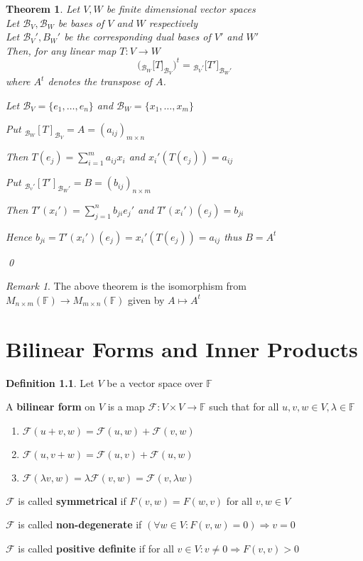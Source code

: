 \documentclass[11pt, a4paper]{report}
\makeatletter
\numberwithin{equation}{section}
\newcommand{\B}{\mathcal{B}}
\newcommand{\F}{\mathbb{F}}
\newcommand{\Fc}{\mathcal{F}}
\numberwithin{equation}{subsection}
\theoremstyle{plain}
\newtheorem{thm}{Theorem}[chapter] %
\theoremstyle{definition}
\newtheorem{defn}{Definition}[chapter]
\theoremstyle{remark}
\newtheorem*{rem}{Remark}
\newtheorem*{prf}{Proof}
\renewenvironment{prf}[1][\proofname]{\par
  \vspace{-\topsep}%
  \normalfont
  \topsep0pt \partopsep0pt %
  \trivlist
  \item[\hskip\labelsep
        \itshape
    #1\@addpunct{.}]\ignorespaces
}{%
  \popQED\endtrivlist\@endpefalse
  \addvspace{6pt plus 6pt} %
}
\newcommand{\pr}[1]{\begin{adjustwidth}{1cm}{} \begin{prf} #1 \end{prf} \end{adjustwidth}}
\makeatother
\begin{document}
\begin{thm}
Let $V, W$ be finite dimensional vector spaces\\
Let $\B_V, \B_W$ be bases of $V$ and $W$ respectively\\
Let $\B_V', B_W'$ be the corresponding dual bases of $V'$ and $W'$\\
Then, for any linear map $T: V \to W$
$$\Big( {_{\B_W}[}T]_{\B_V} \Big)^t = {_{\B_V'}[}T']_{\B_W'}$$
where $A^t$ denotes the transpose of $A$.

\pr{
Let $\B_V = \{ e_1, \ldots, e_n \}$ and $\B_W = \{ x_1, \ldots, x_m \}$

Put $_{\B_W}[T]_{\B_V} = A = (a_{ij})_{m \times n}$

Then $\displaystyle T(e_j) = \sum_{i=1}^m a_{ij} x_i$ and $x_i'(T(e_j)) = a_{ij}$

Put $_{\B_v'}[T']_{\B_W'} = B = (b_{ij})_{n \times m}$

Then $\displaystyle T'(x_i') = \sum_{j=1}^n b_{ji} e_j'$ and $T'(x_i')(e_j) = b_{ji}$

Hence $b_{ji} = T'(x_i')(e_j) = x_i'(T(e_j)) = a_{ij}$ thus $B = A^t$
}\qed
\end{thm}

\begin{rem} The above theorem is the isomorphism from $M_{n \times m}(\F) \to M_{m \times n}(\F)$ given by $A \mapsto A^t$ \end{rem}

\chapter{Bilinear Forms and Inner Products}

\begin{defn}
Let $V$ be a vector space over $\F$

A \textbf{bilinear form} on $V$ is a map $\mathcal{F} : V \times V \to \F$ such that for all $u, v,w \in V, \lambda \in \F$
\begin{adjustwidth}{1cm}{}
\begin{enumerate}[(1) ]
\item $\Fc(u + v, w) = \Fc(u,w) + \Fc(v,w)$
\item $\Fc(u, v + w) = \Fc(u,v) + \Fc(u,w)$
\item $\Fc(\lambda v, w) = \lambda \Fc(v,w) = \Fc(v, \lambda w)$
\end{enumerate}
\end{adjustwidth}
$\Fc$ is called \textbf{symmetrical} if $F(v,w) = F(w,v)$ for all $v,w \in V$

$\Fc$ is called \textbf{non-degenerate} if $(\forall w \in V : F(v,w) = 0) \Rightarrow v = 0$

$\Fc$ is called \textbf{positive definite} if for all $v \in V: v \neq 0 \Rightarrow F(v,v) > 0$
\end{defn}
\end{document}
